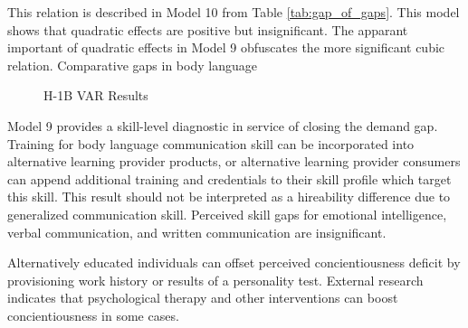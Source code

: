 \documentclass[review]{elsarticle}
\begin{document}
This relation is described in Model 10 from Table \ref{tab:gap_of_gaps}.
This model shows that quadratic effects are positive but insignificant.
The apparant important of quadratic effects in Model 9 obfuscates the more significant cubic relation.
Comparative gaps in body language

\begin{figure}[h!]
    \centering
    \caption{H-1B VAR Results}
    \label{fig:diff_in_bodylang}
\end{figure}

Model 9 provides a skill-level diagnostic in service of closing the demand gap.
Training for body language communication skill can be incorporated into alternative learning provider products,
or alternative learning provider consumers can append additional training and credentials to their skill profile which target this skill.
This result should not be interpreted as a hireability difference due to generalized communication skill.
Perceived skill gaps for emotional intelligence, verbal communication, and written communication are insignificant.

Alternatively educated individuals can offset perceived concientiousness deficit by provisioning work history or results of a personality test.
External research indicates that psychological therapy and other interventions can boost concientiousness in some cases\cite{kilduff_tasselli_landis_2018}.
\end{document}
